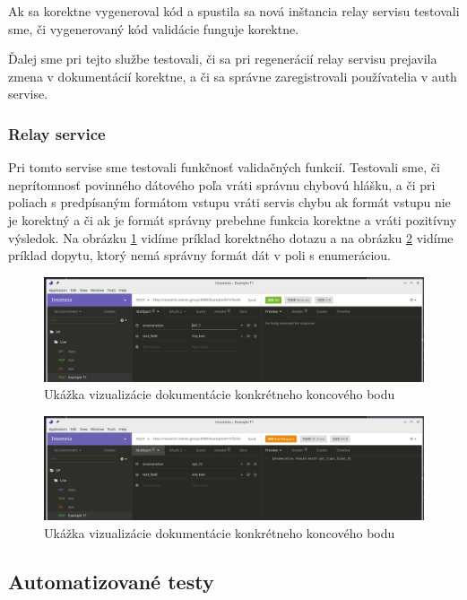 Ak sa korektne vygeneroval kód a spustila sa nová inštancia relay servisu testovali sme, či vygenerovaný kód validácie funguje korektne.

Ďalej sme pri tejto službe testovali, či sa pri regenerácií relay servisu prejavila zmena v dokumentácií korektne, a či sa správne zaregistrovali používatelia v auth servise.

\subsubsection{Relay service}
Pri tomto servise sme testovali funkčnosť validačných funkcií. Testovali sme, či neprítomnosť povinného dátového poľa vráti správnu chybovú hlášku, a či pri poliach s predpísaným formátom vstupu vráti servis chybu ak formát vstupu nie je korektný a či ak je formát správny prebehne funkcia korektne a vráti pozitívny výsledok. Na obrázku \ref{insomnia_200} vidíme príklad korektného dotazu a na obrázku \ref{insomnia_400} vidíme príklad dopytu, ktorý nemá správny formát dát v poli s enumeráciou.

\begin{figure}[!htbp]
	\centering
	\includegraphics[width=16cm]{img/insomnia_200.png}
    \caption{Ukážka vizualizácie dokumentácie konkrétneho koncového bodu}
	\label{insomnia_200}
\end{figure}

\begin{figure}[!htbp]
	\centering
	\includegraphics[width=16cm]{img/insomnia_400.png}
    \caption{Ukážka vizualizácie dokumentácie konkrétneho koncového bodu}
	\label{insomnia_400}
\end{figure}

\subsection{Automatizované testy}

